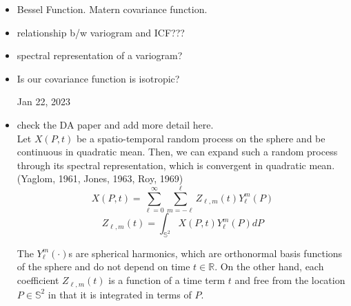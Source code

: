 \documentclass[11pt]{article}
\begin{document}
\begin{itemize}
\item Bessel Function. Matern covariance function.\\

\item relationship b/w variogram and ICF???\\

\item spectral representation of a variogram?\\

\item Is our covariance function is isotropic?\ 

\pagebreak


Jan 22, 2023\\

\item
{\color{red} check the DA paper and add more detail here.}\\
Let $X(P,t)$ be a spatio-temporal random process on the sphere and be continuous in quadratic mean. Then, we can expand such a random process through its spectral representation, which is convergent in quadratic mean.(Yaglom, 1961, Jones, 1963, Roy, 1969)\\
$$ X(P,t)= \sum_{\ell=0}^{\infty}\sum_{m=-\ell}^{\ell}Z_{\ell,m}(t)Y_\ell^m(P)$$
$$Z_{\ell,m}(t)=\int_{\mathbb{S}^2} X(P,t)Y_\ell^m(P)dP$$

The $Y_\ell^m(\cdot)$s are spherical harmonics, which are orthonormal basis functions of the sphere and do not depend on time $t \in \mathbb{R}$. On the other hand, each coefficient $Z_{\ell,m}(t)$ is a function of a time term $t$ and free from the location $P \in \mathbb{S}^2$ in that it is integrated in terms of $P$. \\


\end{itemize}
\end{document}
